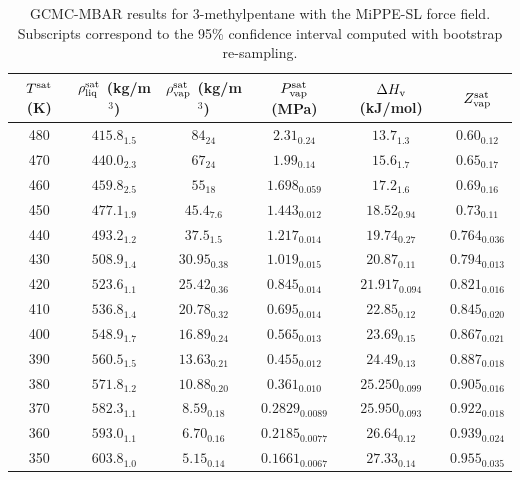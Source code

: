 \documentclass[journal=jctc,manuscript=article]{achemso}
\begin{document}
\begin{table}[htb!]
	\caption{GCMC-MBAR results for 3-methylpentane with the MiPPE-SL force field. Subscripts correspond to the 95\% confidence interval computed with bootstrap re-sampling.}
	\begin{center}
		\begin{tabular}{|c|c|c|c|c|c|}
			\hline
			$T^{\rm sat}$ (K) & $\rho_{\rm liq}^{\rm sat}$ (kg/m$^3$) & $\rho_{\rm vap}^{\rm sat}$ (kg/m$^3$) & $P_{\rm vap}^{\rm sat}$ (MPa) & $\Delta H_{\rm v}$ (kJ/mol) & $Z_{\rm vap}^{\rm sat}$ \\ \hline
			480 & $415.8_{1.5}$ & $84_{24}$ & $2.31_{0.24}$ & $13.7_{1.3}$ & $0.60_{0.12}$ \\
			470 & $440.0_{2.3}$ & $67_{24}$ & $1.99_{0.14}$ & $15.6_{1.7}$ & $0.65_{0.17}$ \\
			460 & $459.8_{2.5}$ & $55_{18}$ & $1.698_{0.059}$ & $17.2_{1.6}$ & $0.69_{0.16}$ \\
			450 & $477.1_{1.9}$ & $45.4_{7.6}$ & $1.443_{0.012}$ & $18.52_{0.94}$ & $0.73_{0.11}$ \\
			440 & $493.2_{1.2}$ & $37.5_{1.5}$ & $1.217_{0.014}$ & $19.74_{0.27}$ & $0.764_{0.036}$ \\
			430 & $508.9_{1.4}$ & $30.95_{0.38}$ & $1.019_{0.015}$ & $20.87_{0.11}$ & $0.794_{0.013}$ \\
			420 & $523.6_{1.1}$ & $25.42_{0.36}$ & $0.845_{0.014}$ & $21.917_{0.094}$ & $0.821_{0.016}$ \\
			410 & $536.8_{1.4}$ & $20.78_{0.32}$ & $0.695_{0.014}$ & $22.85_{0.12}$ & $0.845_{0.020}$ \\
			400 & $548.9_{1.7}$ & $16.89_{0.24}$ & $0.565_{0.013}$ & $23.69_{0.15}$ & $0.867_{0.021}$ \\
			390 & $560.5_{1.5}$ & $13.63_{0.21}$ & $0.455_{0.012}$ & $24.49_{0.13}$ & $0.887_{0.018}$ \\
			380 & $571.8_{1.2}$ & $10.88_{0.20}$ & $0.361_{0.010}$ & $25.250_{0.099}$ & $0.905_{0.016}$ \\
			370 & $582.3_{1.1}$ & $8.59_{0.18}$ & $0.2829_{0.0089}$ & $25.950_{0.093}$ & $0.922_{0.018}$ \\
			360 & $593.0_{1.1}$ & $6.70_{0.16}$ & $0.2185_{0.0077}$ & $26.64_{0.12}$ & $0.939_{0.024}$ \\
			350 & $603.8_{1.0}$ & $5.15_{0.14}$ & $0.1661_{0.0067}$ & $27.33_{0.14}$ & $0.955_{0.035}$ \\
			\hline
		\end{tabular}
	\end{center}
\end{table}
\end{document}
